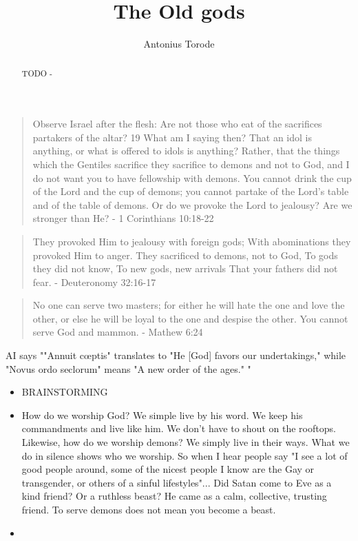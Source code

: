 \documentclass[10pt]{article}
\title{The Old gods}
\author{Antonius Torode}
\begin{document}
\maketitle
\thispagestyle{fancy}


\begin{abstract}
TODO - \lipsum[0-1]
\end{abstract}

\begin{multicols}{2}

\begin{quotation}
Observe Israel after the flesh: Are not those who eat of the sacrifices partakers of the altar? 19 What am I saying then? That an idol is anything, or what is offered to idols is anything? Rather, that the things which the Gentiles sacrifice they sacrifice to demons and not to God, and I do not want you to have fellowship with demons. You cannot drink the cup of the Lord and the cup of demons; you cannot partake of the Lord’s table and of the table of demons. Or do we provoke the Lord to jealousy? Are we stronger than He? - 1 Corinthians 10:18-22
\end{quotation}

\begin{quotation}
They provoked Him to jealousy with foreign gods;
With abominations they provoked Him to anger.
They sacrificed to demons, not to God,
To gods they did not know,
To new gods, new arrivals
That your fathers did not fear. - Deuteronomy 32:16-17
\end{quotation}

\begin{quotation}
No one can serve two masters; for either he will hate the one and love the other, or else he will be loyal to the one and despise the other. You cannot serve God and mammon. - Mathew 6:24
\end{quotation}

AI says ""Annuit cœptis" translates to "He [God] favors our undertakings," while "Novus ordo seclorum" means "A new order of the ages." "

\begin{itemize}
\item BRAINSTORMING
\item How do we worship God? We simple live by his word. We keep his commandments and live like him. We don't have to shout on the rooftops. Likewise, how do we worship demons? We simply live in their ways. What we do in silence shows who we worship. So when I hear people say "I see a lot of good people around, some of the nicest people I know are the Gay or transgender, or others of a sinful lifestyles"... Did Satan come to Eve as a kind friend? Or a ruthless beast? He came as a calm, collective, trusting friend. To serve demons does not mean you become a beast.
\item
\end{itemize}


\end{multicols}
\end{document}
